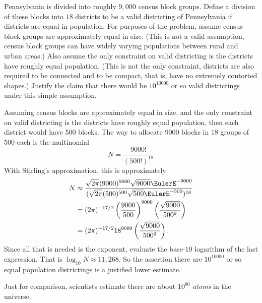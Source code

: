 \documentclass[12pt]{article}
\begin{document}
\begin{exercise}
    Pennsylvania is divided into roughly \( 9{,}000 \) census block
    groups.  Define a division of these blocks into \( 18 \) districts
    to be a valid districting of Pennsylvania if districts are equal in
    population.  For purposes of the problem, assume census block groups
    are approximately equal in size.  (This is not a valid assumption,
    census block groups can have widely varying populations between
    rural and urban areas.) Also assume the only constraint on valid
    districting is the districts have roughly equal population.  (This
    is not the only constraint, districts are also required to be
    connected and to be compact, that is, have no extremely contorted
    shapes.) Justify the claim that there would be \( 10^{10000} \) or
    so valid districtings under this simple assumption.
\end{exercise}

\begin{solution}
    Assuming census blocks are approximately equal in size, and the only
    constraint on valid districting is the districts have roughly equal
    population, then each district would have \( 500 \) blocks.  The way
    to allocate \( 9000 \) blocks in \( 18 \) groups of \( 500 \) each
    is the multinomial
    \[
        N = \frac{9000!}{(500!)^{18}}
    \] With Stirling's approximation, this is approximately
    \begin{align*}
        N &\approx \frac{\sqrt{2\pi} (9000)^{9000} \sqrt{9000} \EulerE^{-9000}}
        {(\sqrt{2\pi} (500)^{500} \sqrt{500} \EulerE^{-500})^{18}} \\
        &= (2\pi)^{-17/2} \left( \frac{9000}{500} \right)^{9000} \left(
        \frac{\sqrt{9000}}{500^{9}} \right) \\
        &= (2\pi)^{-17/2} 18^{9000} \left( \frac{\sqrt{9000}}{500^{9}}
        \right).  \\
    \end{align*}
    Since all that is needed is the exponent, evaluate the base-\( 10 \)
    logarithm of the last expression.  That is \( \log_{10} N \approx 11
    {,}268 \).  So the assertion there are \( 10^{10000} \) or so equal
    population districtings is a justified lower estimate.

    Just for comparison, scientists estimate there are about \( 10^{80} \)
    \emph{atoms} in the universe.
\end{solution}
\end{document}
